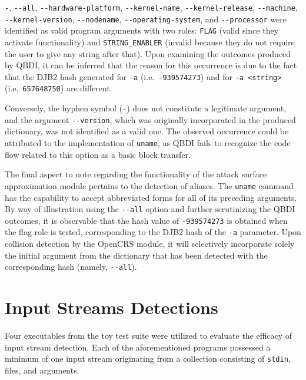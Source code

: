\documentclass[../main.tex]{subfiles}
\begin{document}
\texttt{-}, \texttt{-\/-all}, \texttt{-\/-hardware-platform},
\texttt{-\/-kernel-name}, \texttt{-\/-kernel-release}, \texttt{-\/-machine}, \\ \texttt{-\/-kernel-version}, 
\texttt{-\/-nodename}, \texttt{-\/-operating-system}, and
\texttt{-\/-processor} were identified as valid program arguments with
two roles: \texttt{FLAG} (valid since they activate functionality) and
\texttt{STRING\_ENABLER} (invalid because they do not require the user
to give any string after that). Upon examining the outcomes produced by
QBDI, it can be inferred that the reason for this occurrence is due to
the fact that the DJB2 hash generated for \texttt{-a}
(i.e.~\texttt{-939574273}) and for
\texttt{-a\ \textless{}string\textgreater{}} (i.e.~\texttt{657648750})
are different.

Conversely, the hyphen symbol (\texttt{-}) does not constitute a legitimate
argument, and the argument \texttt{-\/-version}, which was originally
incorporated in the produced dictionary, was not identified as a valid one. The
observed occurrence could be attributed to the implementation of
\texttt{uname}, as QBDI fails to recognize the code flow related to this option
as a basic block transfer.

The final aspect to note regarding the functionality of the attack surface
approximation module pertains to the detection of aliases. The \texttt{uname}
command has the capability to accept abbreviated forms for all of its preceding
arguments. By way of illustration using the \texttt{-\/-all} option and further
scrutinizing the QBDI outcomes, it is observable that the hash value of
\texttt{-939574273} is obtained when the flag role is tested, corresponding to
the DJB2 hash of the \texttt{-a} parameter. Upon collision detection by the
OpenCRS module, it will selectively incorporate solely the initial argument
from the dictionary that has been detected with the corresponding hash (namely,
\texttt{-\/-all}).

\hypertarget{input-streams-detections}{%
  \section{Input Streams Detections}\label{input-streams-detections}}

Four executables from the toy test suite were utilized to evaluate the efficacy
of input stream detection. Each of the aforementioned programs possessed a
minimum of one input stream originating from a collection consisting of
\texttt{stdin}, files, and arguments.
\end{document}
